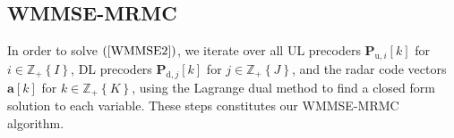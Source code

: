\documentclass[9pt,journal]{IEEEtran}
\newcommand{\paren}[1]{\left({#1}\right)}
\newcommand{\bracket}[1]{{\left [{#1}\right ]}}
\newcommand{\braces}[1]{{\left\{ {#1}\right\}}}
\newcommand{\PiB}{\mathbf{P}_{\textrm{u},i}\bracket{k}}
\newcommand{\PBj}{\mathbf{P}_{\textrm{d},j}\bracket{k}}
\theoremstyle{definition}
\begin{document}
\subsection{WMMSE-MRMC} \label{subsec:seq}
 In order to solve $\paren{\ref{WMMSE2}}$, we iterate over all UL precoders $\PiB$ for $i\in\mathbb{Z}_+\braces{I}$, DL precoders $\PBj$ for $j\in\mathbb{Z}_+\braces{J}$, and the radar code vectors $\mathbf{a}\bracket{k}$ for $k\in\mathbb{Z}_+\braces{K}$, %
 using the Lagrange dual method to find a closed form solution to each variable. These steps constitutes our WMMSE-MRMC algorithm. 
 
\end{document}
